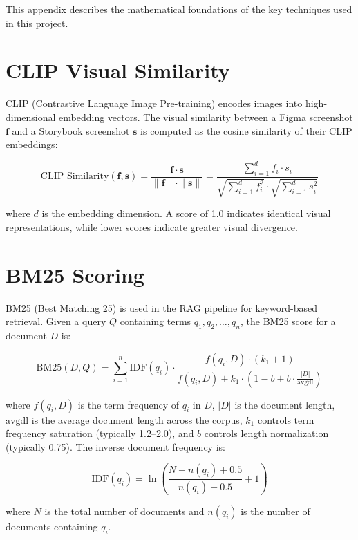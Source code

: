 This appendix describes the mathematical foundations of the key techniques used in this project.

\section{CLIP Visual Similarity}

CLIP (Contrastive Language Image Pre-training) encodes images into high-dimensional embedding vectors. The visual similarity between a Figma screenshot $\mathbf{f}$ and a Storybook screenshot $\mathbf{s}$ is computed as the cosine similarity of their CLIP embeddings:

\begin{equation}
\text{CLIP\_Similarity}(\mathbf{f}, \mathbf{s}) = \frac{\mathbf{f} \cdot \mathbf{s}}{\|\mathbf{f}\| \cdot \|\mathbf{s}\|} = \frac{\sum_{i=1}^{d} f_i \cdot s_i}{\sqrt{\sum_{i=1}^{d} f_i^2} \cdot \sqrt{\sum_{i=1}^{d} s_i^2}}
\end{equation}

where $d$ is the embedding dimension. A score of 1.0 indicates identical visual representations, while lower scores indicate greater visual divergence.

\section{BM25 Scoring}

BM25 (Best Matching 25) is used in the RAG pipeline for keyword-based retrieval. Given a query $Q$ containing terms $q_1, q_2, \ldots, q_n$, the BM25 score for a document $D$ is:

\begin{equation}
\text{BM25}(D, Q) = \sum_{i=1}^{n} \text{IDF}(q_i) \cdot \frac{f(q_i, D) \cdot (k_1 + 1)}{f(q_i, D) + k_1 \cdot \left(1 - b + b \cdot \frac{|D|}{\text{avgdl}}\right)}
\end{equation}

where $f(q_i, D)$ is the term frequency of $q_i$ in $D$, $|D|$ is the document length, $\text{avgdl}$ is the average document length across the corpus, $k_1$ controls term frequency saturation (typically 1.2--2.0), and $b$ controls length normalization (typically 0.75). The inverse document frequency is:

\begin{equation}
\text{IDF}(q_i) = \ln\left(\frac{N - n(q_i) + 0.5}{n(q_i) + 0.5} + 1\right)
\end{equation}

where $N$ is the total number of documents and $n(q_i)$ is the number of documents containing $q_i$.


